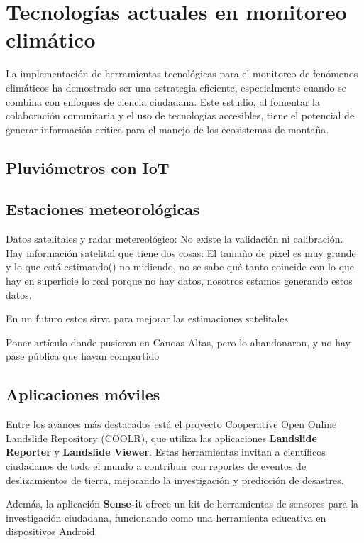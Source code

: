 \newpage
\section{Tecnologías actuales en monitoreo climático}
La implementación de herramientas tecnológicas para el monitoreo de fenómenos climáticos ha demostrado ser una estrategia eficiente, especialmente cuando se combina con enfoques de ciencia ciudadana. Este estudio, al fomentar la colaboración comunitaria y el uso de tecnologías accesibles, tiene el potencial de generar información crítica para el manejo de los ecosistemas de montaña.



\subsection{Pluviómetros con IoT}

\subsection{Estaciones meteorológicas}

Datos satelitales y radar metereológico: No existe la validación ni calibración. Hay información satelital que tiene dos cosas: El tamaño de pixel es muy grande y lo que está estimando() no midiendo, no se sabe qué tanto coincide con lo que hay en superficie lo real porque no hay datos, nosotros estamos generando estos datos.

En un futuro estos sirva para mejorar las estimaciones satelitales

Poner artículo donde pusieron en Canoas Altas, pero lo abandonaron, y no hay pase pública que hayan compartido


\subsection{Aplicaciones móviles}

Entre los avances más destacados está el proyecto Cooperative Open Online Landslide Repository (COOLR), que utiliza las aplicaciones \textbf{Landslide Reporter} y \textbf{Landslide Viewer}. Estas herramientas invitan a científicos ciudadanos de todo el mundo a contribuir con reportes de eventos de deslizamientos de tierra, mejorando la investigación y predicción de desastres.\cite{coolr2021} 

Además, la aplicación \textbf{Sense-it} ofrece un kit de herramientas de sensores para la investigación ciudadana, funcionando como una herramienta educativa en dispositivos Android.\cite{van2017senseit}


